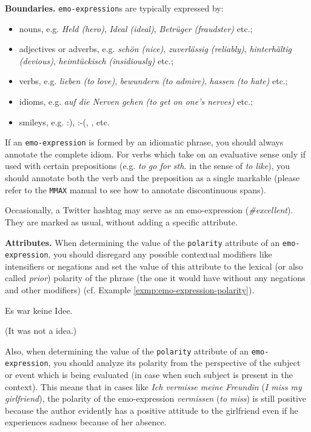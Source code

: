 \noindent\textbf{Boundaries.} \texttt{emo-expression}s are typically
expressed by:
\begin{itemize}
  \item nouns, e.g. \textit{Held (hero)}, \textit{Ideal (ideal)},
    \textit{Betr\"uger (fraudster)} etc.;

  \item adjectives or adverbs, e.g. \textit{sch\"on (nice)},
    \textit{zuverl\"assig (reliably)}, \textit{hinterh\"altig
      (devious)}, \textit{heimt\"uckisch (insidiously)} etc.;

  \item verbs, e.g. \textit{lieben (to love)}, \textit{bewundern (to
    admire)}, \textit{hassen (to hate)} etc.;

  \item idioms, e.g. \textit{auf die Nerven gehen (to get on one's
    nerves)} etc.;

  \item smileys, e.g. :), :-(, \smiley{}, \frownie{} etc.
\end{itemize}
If an \texttt{emo-expression} is formed by an idiomatic phrase, you should
always annotate the complete idiom.  For verbs which take on an evaluative
sense only if used with certain prepositions (e.g. \textit{to go for sth.} in
the sense of \textit{to like}), you should annotate both the verb and the
preposition as a single markable (please refer to the \texttt{MMAX} manual to
see how to annotate discontinuous spans).

Occasionally, a Twitter hashtag may serve as an emo-expression
(\emph{\#excellent}).  They are marked as usual, without adding a
specific attribute.

\noindent\textbf{Attributes.} When determining the value of the
\texttt{polarity} attribute of an \texttt{emo-expression}, you should
disregard any possible contextual modifiers like intensifiers or
negations and set the value of this attribute to the lexical (or also
called \emph{prior}) polarity of the phrase (the one it would have
without any negations and other modifiers) (cf. Example
\ref{exmp:emo-expression-polarity}).
\begin{example}
Es war keine  Idee.

(It was not a  idea.)\label{exmp:emo-expression-polarity}
\end{example}

Also, when determining the value of the \texttt{polarity} attribute of
an \texttt{emo-expression}, you should analyze its polarity from the
perspective of the subject or event which is being evaluated (in case
when such subject is present in the context).  This means that in
cases like \textit{Ich vermisse meine Freundin} (\textit{I miss my
  girlfriend}), the polarity of the emo-expression \textit{vermissen}
(\textit{to miss}) is still positive because the author evidently has
a positive attitude to the girlfriend even if he experiences sadness
because of her absence.

